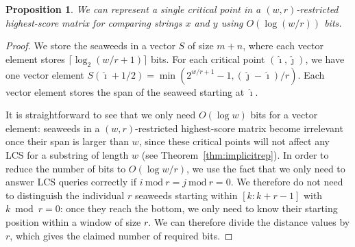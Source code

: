 \documentclass{IOS-Book-Article}     \usepackage{amsmath}
\theoremstyle{plain}
\newtheorem{proposition}[theorem]{Proposition}
\theoremstyle{definition}
\begin{document}
\begin{proposition}\label{prop:w_r_bits}
 We can represent a single critical point in a $(w,r)$-restricted
 highest-score matrix for comparing strings $x$ and $y$ using $O(\log(w/r))$ bits.
\end{proposition}
\begin{proof}
 We store the seaweeds in a vector $S$ of size $m+n$, where each vector element
 stores $\lceil \log_2(w/r + 1) \rceil$ bits. For each critical point
 $(\hat{\imath}, \hat{\jmath})$, we have one vector element
 $S(\hat{\imath}+1/2) = \min(2^{w/r+1}-1,(\hat{\jmath}-\hat{\imath})/r)$. Each
 vector element stores the span of the seaweed starting at $\hat{\imath}$.

 It is straightforward to see that we only need $O(\log w)$ bits for a vector
 element: seaweeds in a $(w,r)$-restricted highest-score matrix become irrelevant once
 their span is larger than $w$, since these critical points will not affect any
 LCS for a substring of length $w$ (see Theorem~\ref{thm:implicitrep}).
 In order to reduce the number of bits  to $O(\log w/r)$, we use the fact that we
 only need to answer LCS queries correctly if $i\ \mathrm{mod}\ r = j\
 \mathrm{mod}\ r = 0$. We therefore do not need to distinguish the individual
 $r$ seaweeds starting within $[k:k+r-1]$ with $k \bmod r = 0$: once
 they reach the bottom, we only need to know their starting position within a window of
 size $r$. We can therefore divide the distance values by $r$, which gives
 the claimed number of required bits.
\end{proof}
\end{document}
